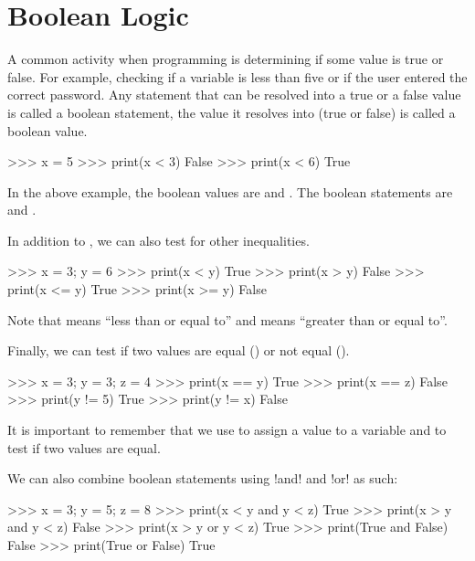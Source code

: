 \documentclass[11pt]{cselabheader}
\begin{document}
\pagebreak

\section{Boolean Logic}

A common activity when programming is determining if some value is true or
false. For example, checking if a variable is less than five or if the user
entered the correct password. Any statement that can be resolved into a true or
a false value is called a boolean statement, the value it resolves into (true or
false) is called a boolean value.

\begin{pyconcode}
>>> x = 5
>>> print(x < 3)
False
>>> print(x < 6)
True
\end{pyconcode}

In the above example, the boolean values are  and
. The boolean statements are  and 
. 

In addition to \pythoninline{<}, we can also test for other
inequalities.

\begin{pyconcode}
>>> x = 3; y = 6
>>> print(x < y)
True
>>> print(x > y)
False
>>> print(x <= y)
True
>>> print(x >= y)
False
\end{pyconcode}

Note that \pythoninline{<=} means ``less than or equal to'' and \pythoninline{>=}
means ``greater than or equal to''. 

Finally, we can test if two values are equal
(\pythoninline{==}) or not equal (\pythoninline{!=}).

\begin{pyconcode}
>>> x = 3; y = 3; z = 4
>>> print(x == y)
True
>>> print(x == z)
False
>>> print(y != 5)
True
>>> print(y != x)
False
\end{pyconcode}

It is important to remember that we use \pythoninline{=} to assign a value to a variable and \pythoninline{==} to test if two values are equal.

We can also combine boolean statements using \pythoninline!and! and \pythoninline!or!
as such:

\begin{pyconcode}
>>> x = 3; y = 5; z = 8
>>> print(x < y and y < z)
True
>>> print(x > y and y < z)
False
>>> print(x > y or y < z)
True
>>> print(True and False)
False
>>> print(True or False)
True
\end{pyconcode}
\end{document}
